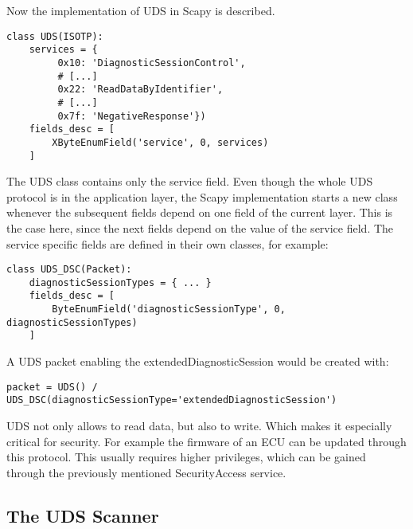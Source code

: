 Now the implementation of UDS in Scapy is described.

\begin{samepage}
\begin{verbatim}
class UDS(ISOTP):
    services = {
         0x10: 'DiagnosticSessionControl',
         # [...]
         0x22: 'ReadDataByIdentifier',
         # [...]
         0x7f: 'NegativeResponse'})
    fields_desc = [
        XByteEnumField('service', 0, services)
    ]
\end{verbatim}
\end{samepage}


The UDS class contains only the service field. Even though the whole UDS protocol is in the application layer, the Scapy implementation starts a new class whenever the subsequent fields depend on one field of the current layer. This is the case here, since the next fields depend on the value of the service field. The service specific fields are defined in their own classes, for example:

\begin{samepage}
\begin{verbatim}
class UDS_DSC(Packet):
    diagnosticSessionTypes = { ... }
    fields_desc = [
        ByteEnumField('diagnosticSessionType', 0,  diagnosticSessionTypes)
    ]
\end{verbatim}
\end{samepage}

A UDS packet enabling the extendedDiagnosticSession would be created with:

\begin{samepage}
\begin{verbatim}
packet = UDS() / UDS_DSC(diagnosticSessionType='extendedDiagnosticSession')
\end{verbatim}
\end{samepage}

UDS not only allows to read data, but also to write. Which makes it especially critical for security. For example the firmware of an ECU can be updated through this protocol. This usually requires higher privileges, which can be gained through the previously mentioned SecurityAccess service.


\subsection{The UDS Scanner}



